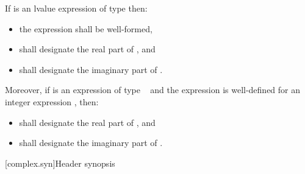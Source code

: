 \pnum
If  is an lvalue expression of type \cv{}  then:

\begin{itemize}
\item the expression  shall be well-formed,
\item {} shall designate the real part of , and
\item {} shall designate the imaginary part of .
\end{itemize}

Moreover, if  is an expression of type \cv{}~ and the expression  is well-defined for an integer expression , then:

\begin{itemize}
\item {} shall designate the real part of , and
\item {} shall designate the imaginary part of .
\end{itemize}

[complex.syn]{Header  synopsis}

